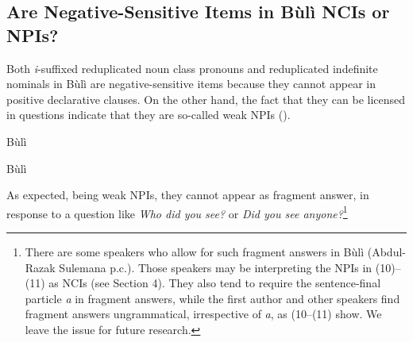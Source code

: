 \documentclass[output=paper,colorlinks,citecolor=brown]{langscibook}
\begin{document}


\subsection{Are Negative-Sensitive Items in Bùlì NCIs or NPIs?}

Both \textit{i}-suffixed reduplicated noun class pronouns  and reduplicated indefinite nominals in Bùlì are negative-sensitive items because they cannot appear in positive declarative clauses. On the other hand, the fact that they can be licensed in questions indicate that they are so-called weak NPIs (\citealt{VanDerWouden1997}).



\ea Bùlì
\z
\z




\ea Bùlì
\z
\z

As expected, being weak NPIs, they cannot appear as fragment answer, in response to a question like \textit{Who did you see?} or \textit{Did you see anyone?}\footnote{There are some speakers who allow for such fragment answers in Bùlì (Abdul-Razak Sulemana p.c.). Those speakers may be interpreting the NPIs in (10)--(11) as NCIs (see Section 4). They also tend to require the sentence-final particle \textit{a} in fragment answers, while the first author and other speakers find fragment answers ungrammatical, irrespective of \textit{a}, as  (10--(11) show. We leave the issue for future research.}

\z
\end{document}
